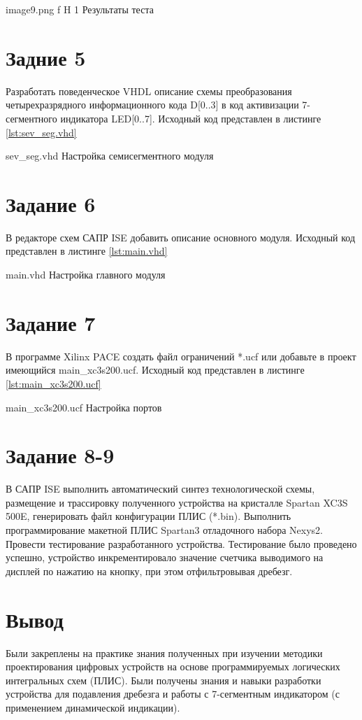 \documentclass{bmstu}
\begin{document}
	{image9.png}
	{f}
	{H}
	{1\textwidth}
	{Результаты теста}
	
\section*{Задние 5}
Разработать поведенческое VHDL описание схемы преобразования четырехразрядного информационного кода D[0..3] в код активизации 7-сегментного индикатора LED[0..7].
Исходный код представлен в листинге \ref{lst:sev_seg.vhd}

	{sev_seg.vhd}
	{Настройка семисегментного модуля}


\section*{Задание 6}
	В редакторе схем САПР ISE добавить описание основного модуля.
	Исходный код представлен в листинге \ref{lst:main.vhd} 

	{main.vhd}
	{Настройка главного модуля}

\section*{Задание 7}

В программе Xilinx PACE создать файл ограничений *.ucf или добавьте в проект имеющийся main\_xc3s200.ucf.
Исходный код представлен в листинге \ref{lst:main_xc3s200.ucf}

	{main_xc3s200.ucf}
	{Настройка портов}

\section*{Задание 8-9}
	В САПР ISE выполнить автоматический синтез технологической схемы, размещение и трассировку полученного устройства на кристалле Spartan XC3S 500E, генерировать файл конфигурации ПЛИС (*.bin).
	Выполнить программирование макетной ПЛИС Spartan3 отладочного набора Nexys2.
Провести тестирование разработанного устройства.
Тестирование было проведено успешно, устройство инкрементировало значение счетчика выводимого на дисплей по нажатию на кнопку, при этом отфильтровывая дребезг.

\section*{Вывод}
Были закреплены на практике знания полученных при изучении методики проектирования цифровых устройств на основе программируемых логических интегральных схем (ПЛИС). Были получены знания и навыки разработки устройства для подавления дребезга и работы с 7-сегментным индикатором (с применением динамической индикации).
\end{document}
